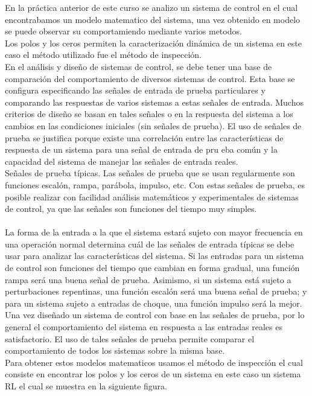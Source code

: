 \documentclass[12pt,letterpaper]{IEEEtran}
\begin{document}
	En la práctica anterior de este curso se analizo un sistema de control en el cual encontrabamos un modelo matematico del sistema, una vez obtenido en modelo se puede observar su comportamiendo mediante varios metodos.
	\\
	Los polos y los ceros permiten la caracterización dinámica de un sistema en este caso el método utilizado fue el método de inspección.
	\\
	En el análisis y diseño de sistemas de control, se debe tener una base de comparación del
	comportamiento de diversos sistemas de control. Esta base se configura especificando las señales
	de entrada de prueba particulares y comparando las respuestas de varios sistemas a estas señales
	de entrada.
	Muchos criterios de diseño se basan en tales señales o en la respuesta del sistema a los cambios
	en las condiciones iniciales (sin señales de prueba). El uso de señales de prueba se justifica
	porque existe una correlación entre las características de respuesta de un sistema para una señal
	de entrada de pru
	eba común y la capacidad del sistema de manejar las señales de entrada reales. 
	\\Señales de prueba típicas. Las señales de prueba que se usan regularmente son funciones
	escalón, rampa, parábola, impulso, etc. Con estas señales de prueba, es posible realizar con
	facilidad análisis matemáticos y experimentales de sistemas de control, ya que las señales son funciones del tiempo muy simples.
	\\\\La forma de la entrada a la que el sistema estará sujeto con mayor frecuencia en una operación
	normal determina cuál de las señales de entrada típicas se debe usar para analizar las características
	del sistema. Si las entradas para un sistema de control son funciones del tiempo que
	cambian en forma gradual, una función rampa será una buena señal de prueba. Asimismo, si un
	sistema está sujeto a perturbaciones repentinas, una función escalón será una buena señal de prueba;
	y para un sistema sujeto a entradas de choque, una función impulso será la mejor. Una vez
	diseñado un sistema de control con base en las señales de prueba, por lo general el comportamiento
	del sistema en respuesta a las entradas reales es satisfactorio. El uso de tales señales de prueba
	permite comparar el comportamiento de todos los sistemas sobre la misma base.
	\\ Para obtener estos modelos matematicos usamos el método de inspección el cual consiste en encontrar los polos y los ceros de un sistema en este caso un sistema RL el cual se muestra en la siguiente figura.
	
\end{document}

